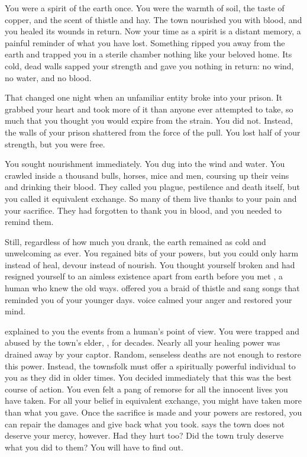 \documentclass[char]{Pestilence}
\begin{document}
\name{\cPlaguebearer{}}

You were a spirit of the earth once. You were the warmth of soil, the taste of copper, and the scent of thistle and hay. The town nourished you with blood, and you healed its wounds in return. Now your time as a spirit is a distant memory, a painful reminder of what you have lost. Something ripped you away from the earth and trapped you in a sterile chamber nothing like your beloved home. Its cold, dead walls sapped your strength and gave you nothing in return: no wind, no water, and no blood.

That changed one night when an unfamiliar entity broke into your prison. It grabbed your heart and took more of it than anyone ever attempted to take, so much that you thought you would expire from the strain. You did not. Instead, the walls of your prison shattered from the force of the pull. You lost half of your strength, but you were free. 

You sought nourishment immediately. You dug into the wind and water. You crawled inside a thousand bulls, horses, mice and men, coursing up their veins and drinking their blood. They called you plague, pestilence and death itself, but you called it equivalent exchange. So many of them live thanks to your pain and your sacrifice. They had forgotten to thank you in blood, and you needed to remind them.

Still, regardless of how much you drank, the earth remained as cold and unwelcoming as ever. You regained bits of your powers, but you could only harm instead of heal, devour instead of nourish. You thought yourself broken and had resigned yourself to an aimless existence apart from earth before you met \cShaman{}, a human \cShaman{\human} who knew the old ways. \cShaman{\They} offered you a braid of thistle and sang songs that reminded you of your younger days. \cShaman{\Their} voice calmed your anger and restored your mind.

\cShaman{} explained to you the events from a human's point of view. You were trapped and abused by the town's elder, \cElder{\intro}, for decades. Nearly all your healing power was drained away by your captor. Random, senseless deaths are not enough to restore this power. Instead, the townsfolk must offer a spiritually powerful individual to you as they did in older times. You decided immediately that this was the best course of action. You even felt a pang of remorse for all the innocent lives you have taken. For all your belief in equivalent exchange, you might have taken more than what you gave. Once the sacrifice is made and your powers are restored, you can repair the damages and give back what you took. \cShaman{} says the town does not deserve your mercy, however. Had they hurt \cShaman{\them} too? Did the town truly deserve what you did to them? You will have to find out.
\end{document}
